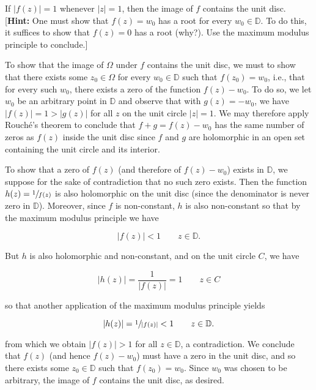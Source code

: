 If $|f(z)| = 1$ whenever $|z| = 1$, then the image of $f$ contains the unit disc.
\ \\

[\textbf{Hint:} One must show that $f(z) = w_0$ has a root for every $w_0 \in \mathbb{D}$. To do this, it suffices to
show that $f(z) = 0$ has a root (why?). Use the maximum modulus principle to conclude.]

\begin{solution}
  To show that the image of $\Omega$ under $f$ contains the unit disc, we must to show that there exists some 
  $z_0 \in \Omega$ for every $w_0 \in \mathbb{D}$ such that $f(z_0) = w_0$, i.e., that for every such $w_0$, there 
  exists a zero of the function $f(z) - w_0$. To do so, we let $w_0$ be an arbitrary point in $\mathbb{D}$ and observe 
  that with $g(z) = -w_0$, we have $|f(z)| = 1 > |g(z)|$ for all $z$ on the unit circle $|z| = 1$. We may therefore 
  apply Rouch\'e's theorem to conclude that $f + g = f(z) - w_0$ has the same number of zeros as $f(z)$ inside the unit 
  disc since $f$ and $g$ are holomorphic in an open set containing the unit circle and its interior.

  To show that a zero of $f(z)$ (and therefore of $f(z) - w_0$) exists in $\mathbb{D}$, we suppose for the sake of 
  contradiction that no such zero exists. Then the function $h(z) = \sfrac{1}{f(z)}$ is also holomorphic on the unit 
  disc (since the denominator is never zero in $\mathbb{D}$). Moreover, since $f$ is non-constant, $h$ is also 
  non-constant so that by the maximum modulus principle we have

  $$
  |f(z)| < 1 \qquad z \in \mathbb{D}.
  $$

  But $h$ is also holomorphic and non-constant, and on the unit circle $C$, we have

  $$
  |h(z)| = \frac{1}{|f(z)|} = 1 \qquad z \in C
  $$

  so that another application of the maximum modulus principle yields

  $$
  |h(z)| = \sfrac{1}{|f(z)|} < 1 \qquad z \in \mathbb{D}.
  $$

  from which we obtain $|f(z)| > 1$ for all $z \in \mathbb{D}$, a contradiction. We conclude that $f(z)$ (and hence 
  $f(z) - w_0$) must have a zero in the unit disc, and so there exists some $z_0 \in \mathbb{D}$ such that 
  $f(z_0) = w_0$. Since $w_0$ was chosen to be arbitrary, the image of $f$ contains the unit disc, as desired.
  \ \\
\end{solution}